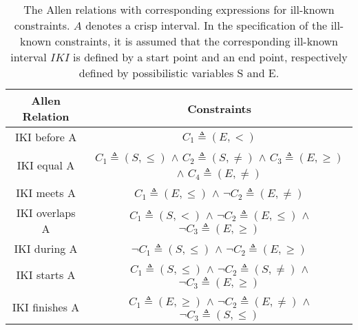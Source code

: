 \vspace{-15pt}
\begin{table}
\caption{The Allen relations with corresponding expressions for ill-known constraints. $A$ denotes a crisp interval. In the specification of the ill-known constraints, it is assumed that the corresponding ill-known interval $IKI$ is defined by a start point and an end point, respectively defined by possibilistic variables S and E.}
\centering
\begin{tabular}{c|c}
\hline
\textbf{Allen Relation }& \textbf{Constraints }\\
\hline

IKI before A & $C_1 \triangleq \left(E,<\right)$ \\
\hline

IKI equal A & $C_1\triangleq \left(S,\leq\right)$ $\wedge$ $C_2\triangleq \left(S, \neq \right)$ $\wedge$ $C_3\triangleq \left(E,\geq\right)$ $\wedge$ $C_4\triangleq \left(E,\neq\right)$ \\
\hline

IKI meets A & $C_1\triangleq \left(E,\leq\right)$ $\wedge$ $\neg C_2\triangleq \left(E, \neq\right)$ \\
\hline

IKI overlaps A & $C_1\triangleq \left(S,<\right)$ $\wedge$ $\neg C_2\triangleq \left(E, \leq\right)$ $\wedge$ $\neg C_3\triangleq \left(E, \geq\right)$ \\
\hline

IKI during A & $\neg C_1\triangleq \left(S, \leq \right)$ $\wedge$ $\neg C_2\triangleq \left(E, \geq \right)$ \\
\hline

IKI starts A & $C_1\triangleq \left(S, \leq \right)$ $\wedge$ $\neg C_2\triangleq \left(S, \neq\right)$ $\wedge$ $\neg C_3\triangleq \left(E, \geq \right)$ \\
\hline

IKI finishes A & $C_1\triangleq \left(E, \geq \right)$ $\wedge$ $\neg C_2\triangleq \left(E, \neq\right)$ $\wedge$ $\neg C_3\triangleq \left(S, \leq\right)$ \\

\hline
\end{tabular}
\label{table:ikc}
\end{table}



